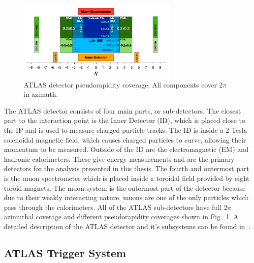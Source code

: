\begin{figure}
	\centering
	\includegraphics[width=0.7\textwidth]{figures/atlaspseudorap.png} %
	\caption{ ATLAS detector pseudorapidity coverage. All components cover $2\pi$ in azimuth. }	
	\label{fig:atlasrap}%
\end{figure}

The ATLAS detector consists of four main parts, or sub-detectors. The closest part to the interaction point is the Inner Detector (ID), which is placed close to the IP and is used to measure charged particle tracks. The ID is inside a 2 Tesla solenoidal magnetic field, which causes charged particles to curve, allowing their momentum to be measured. Outside of the ID are the electromagnetic (EM) and hadronic calorimeters. These give energy measurements and are the primary detectors for the analysis presented in this thesis. The fourth and outermost part is the muon spectrometer which is placed inside a toroidal field provided by eight toroid magnets. The muon system is the outermost part of the detector because due to their weakly interacting nature, muons are one of the only particles which pass through the calorimeters. All of the ATLAS sub-detectors have full $2\pi$ azimuthal coverage and different pseudorapidity coverages shown in  Fig.~\ref{fig:atlasrap}. A detailed description of the ATLAS detector and it's subsystems can be found in~\cite{Aad:2008zzm}. 

\subsection{ATLAS Trigger System}
\label{sec:trigger}

